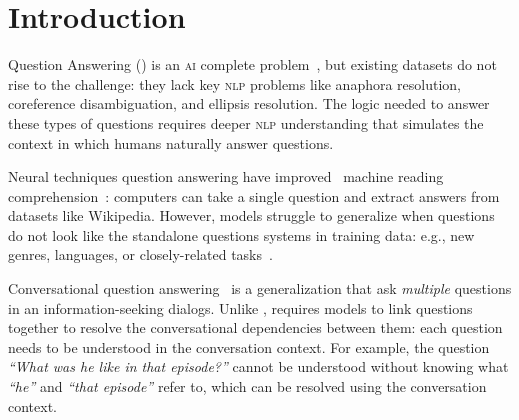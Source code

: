\section{Introduction}


 


Question Answering () is an \textsc{ai} complete
problem~\cite{webber-92}, but existing  datasets do not rise
to the challenge: they lack key \textsc{nlp} problems like anaphora
resolution, coreference disambiguation, and ellipsis resolution.
The logic needed to answer these types of questions requires deeper
\textsc{nlp} understanding that simulates the context in which humans
naturally answer questions.

Neural techniques question answering have
improved~\cite{devlin2019bert} machine reading
comprehension~\cite[]{rajpurkar-16}: computers can take a
single question and extract answers from datasets like Wikipedia.
However,  models struggle to generalize when
questions do not look like the standalone questions systems in training
data: e.g., new genres, languages, or closely-related
tasks~\cite{yogatama2019learning}.

Conversational question answering~\cite[]{reddy2018CoQA} is a
generalization that ask \emph{multiple} questions in an
information-seeking dialogs.
Unlike ,  requires models to link questions together
to resolve the conversational dependencies between them: each question
needs to be understood in the conversation context.
For example, the question \textit{``What was he like in that episode?''}
cannot be understood without knowing what \textit{``he''} and
\textit{``that episode''} refer to, which can be resolved using the
conversation context.

